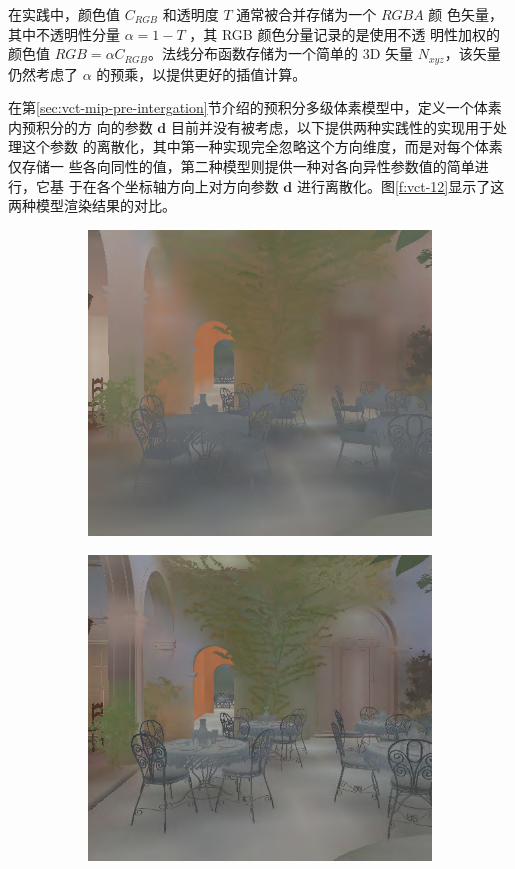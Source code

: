 在实践中，颜色值 $C_{RGB}$ 和透明度 $T$ 通常被合并存储为一个 $RGBA$ 颜 色矢量，其中不透明性分量 $\alpha = 1 − T$ ，其 RGB 颜色分量记录的是使用不透 明性加权的颜色值 $RGB =\alpha C_{RGB}$。法线分布函数存储为一个简单的 3D 矢量 $N_{xyz}$，该矢量仍然考虑了 $\alpha$ 的预乘，以提供更好的插值计算。

在第\ref{sec:vct-mip-pre-intergation}节介绍的预积分多级体素模型中，定义一个体素内预积分的方 向的参数 $\mathbf{d}$ 目前并没有被考虑，以下提供两种实践性的实现用于处理这个参数 的离散化，其中第一种实现完全忽略这个方向维度，而是对每个体素仅存储一 些各向同性的值，第二种模型则提供一种对各向异性参数值的简单进行，它基 于在各个坐标轴方向上对方向参数 $\mathbf{d}$ 进行离散化。图\ref{f:vct-12}显示了这两种模型渲染结果的对比。

\begin{figure}
	\begin{subfigure}[b]{0.5\textwidth}
		\includegraphics[width=\textwidth]{figures/vct/vct-12-1}
		\caption{}
	\end{subfigure}
	\begin{subfigure}[b]{0.5\textwidth}
		\includegraphics[width=\textwidth]{figures/vct/vct-12-2}

\end{subfigure}
\end{figure}
